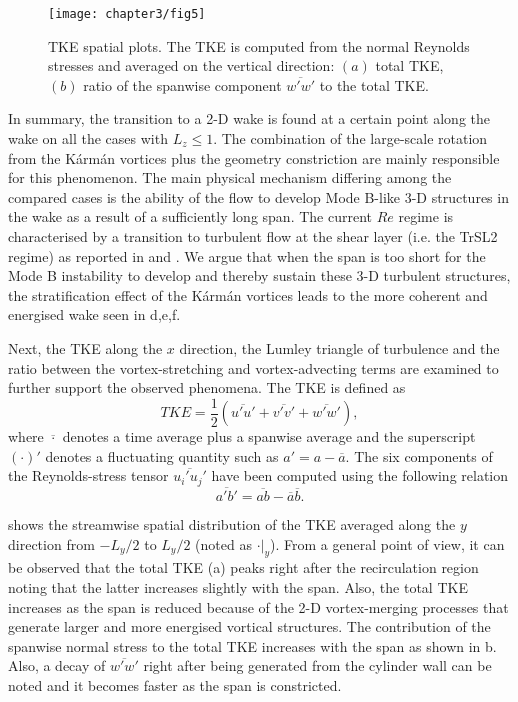 \documentclass[../main.tex]{subfiles}
\begin{document}
\begin{figure}
	\vspace*{0.3cm}
  \centerline{\texttt{[image: chapter3/fig5]}}
  \caption{TKE spatial plots.
The TKE is computed from the normal Reynolds stresses and averaged on the vertical direction: $(a)$ total TKE, $(b)$ ratio of the spanwise component $\overline{w'w'}$ to the total TKE.}
\label{fig:TKE}
\end{figure}

In summary, the transition to a 2-D wake is found at a certain point along the wake on all the cases with $L_z\le1$.
The combination of the large-scale rotation from the K\'{a}rm\'{a}n vortices plus the geometry constriction are mainly responsible for this phenomenon.
The main physical mechanism differing among the compared cases is the ability of the flow to develop Mode B-like 3-D structures in the wake as a result of a sufficiently long span.
The current $Re$ regime is characterised by a transition to turbulent flow at the shear layer (i.e. the TrSL2 regime) as reported in \cite{Bloor1964} and \cite{Kourta1987}.
We argue that when the span is too short for the Mode B instability to develop and thereby sustain these 3-D turbulent structures, the stratification effect of the K\'{a}rm\'{a}n vortices leads to the more coherent and energised wake seen in  d,e,f.

Next, the TKE along the $x$ direction, the Lumley triangle of turbulence and the ratio between the vortex-stretching and vortex-advecting terms are examined to further support the observed phenomena.
The TKE is defined as
\begin{equation}
TKE = \frac{1}{2}\left(\overline{u'u'}+\overline{v'v'}+\overline{w'w'}\right),
\end{equation}
where $\overline{\cdot}$ denotes a time average plus a spanwise average and the superscript $(\cdot)'$ denotes a fluctuating quantity such as $a'=a-\overline{a}$.
The six components of the Reynolds-stress tensor $\overline{u_i' u_j'}$ have been computed using the following relation
\begin{equation}
\overline{a'b'} = \overline{ab} - \overline{a}\overline{b}.
\end{equation}

 shows the streamwise spatial distribution of the TKE averaged along the $y$ direction from $-L_y/2$ to $L_y/2$ (noted as $\cdot|_y$).
From a general point of view, it can be observed that the total TKE (a) peaks right after the recirculation region noting that the latter increases slightly with the span.
Also, the total TKE increases as the span is reduced because of the 2-D vortex-merging processes that generate larger and more energised vortical structures.
The contribution of the spanwise normal stress to the total TKE increases with the span as shown in b.
Also, a decay of $\overline{w'w'}$ right after being generated from the cylinder wall can be noted and it becomes faster as the span is constricted.
\end{document}

